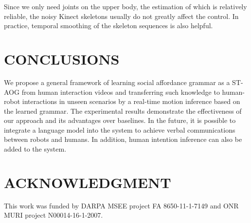 \documentclass[letterpaper, 10 pt, conference]{ieeeconf}  %
\begin{document}
Since we only need joints on the upper body, the estimation of which is relatively reliable, the noisy Kinect skeletons usually do not greatly affect the control. In practice, temporal smoothing of the skeleton sequences is also helpful.




\section{CONCLUSIONS}
We propose a general framework of learning social affordance grammar as a ST-AOG from human interaction videos and transferring such knowledge to human-robot interactions in unseen scenarios by a real-time motion inference based on the learned grammar. The experimental results demonstrate the effectiveness of our approach and its advantages over baselines. In the future, it is possible to integrate a language model into the system to achieve verbal communications between robots and humans. In addition, human intention inference can also be added to the system.



\section*{ACKNOWLEDGMENT}
This work was funded by DARPA MSEE project FA 8650-11-1-7149 and ONR MURI project N00014-16-1-2007.









%
%
\end{document}
